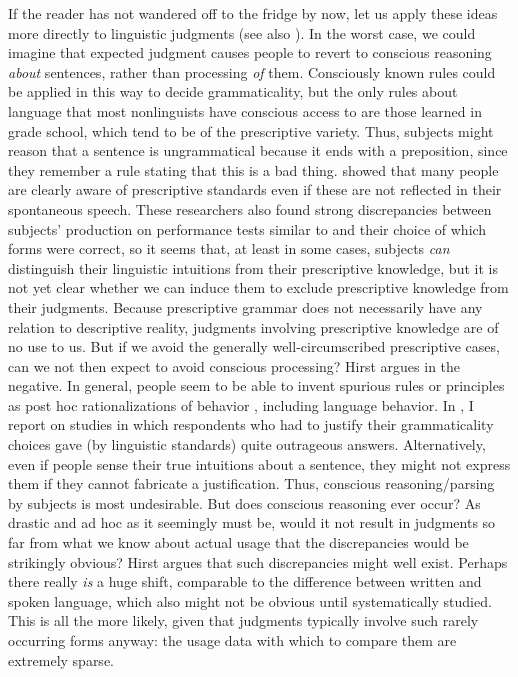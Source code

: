 If the reader has not wandered off to the fridge by now, let us apply these ideas more directly to linguistic judgments (see also \citet[202\textendash{}203]{Birdsong1989}). In the worst case, we could imagine that expected judgment causes people to revert to conscious reasoning \textit{about} sentences, rather than processing \textit{of} them. Consciously known rules could be applied in this way to decide grammaticality, but the only rules about language that most nonlinguists have conscious access to are those learned in grade school, which tend to be of the prescriptive variety. Thus, subjects might reason that a sentence is ungrammatical because it ends with a preposition, since they remember a rule stating that this is a bad thing. \citet{SchmidtEtAl1977} showed that many people are clearly aware of prescriptive standards even if these are not reflected in their spontaneous speech. These researchers also found strong discrepancies between subjects' production on performance tests similar to  and their choice of which forms were correct, so it seems that, at least in some cases, subjects \textit{can} distinguish their linguistic intuitions from their prescriptive knowledge, but it is not yet clear whether we can induce them to exclude prescriptive knowledge from their judgments. Because prescriptive grammar does not necessarily have any relation to descriptive reality, judgments involving prescriptive knowledge are of no use to us. But if we
avoid the generally well-circumscribed prescriptive cases, can we not then expect to avoid conscious processing? Hirst argues in the negative. In general, people seem to be able to invent spurious rules or principles as post hoc rationalizations of behavior \citep{NisbettEtAl1977}, including language behavior. In , I report on studies in which respondents who had to justify their grammaticality choices gave (by linguistic standards) quite outrageous answers. Alternatively, even if people sense their true intuitions about a sentence, they might not express them if they cannot fabricate a justification. Thus, conscious reasoning/parsing by subjects is most undesirable. But does conscious reasoning ever occur? As drastic and ad hoc as it seemingly must be, would it not result in judgments so far from what we know about actual usage that the discrepancies would be strikingly obvious? Hirst argues that such discrepancies might well exist. Perhaps there really \textit{is} a huge shift, comparable to the difference between written and spoken language, which also might not be obvious until systematically studied. This is all the more likely, given that judgments typically involve such rarely occurring forms anyway: the usage data with which to compare them are extremely sparse.

